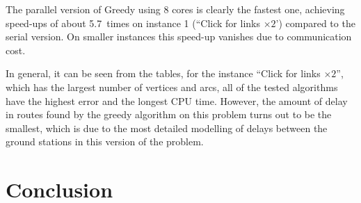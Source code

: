 \documentclass{ifacconf}
\begin{document}
The parallel version of Greedy using 8 cores is clearly the fastest one, achieving speed-ups of
about 5.7~times on instance 1 (``Click for links $\times 2$') compared to the serial version. On smaller instances
this speed-up vanishes due to communication cost. 

In general, it can be seen from the tables, for the instance ``Click for links $\times 2$'',
which has the largest number of vertices and arcs, all of
the tested algorithms have the highest error and the
longest CPU time.
However, the amount of delay in routes
found by the greedy algorithm on this problem turns out to be the smallest,
which is due to the most detailed modelling of 
delays between the ground stations in this version of the problem.



\section{Conclusion}
\end{document}
